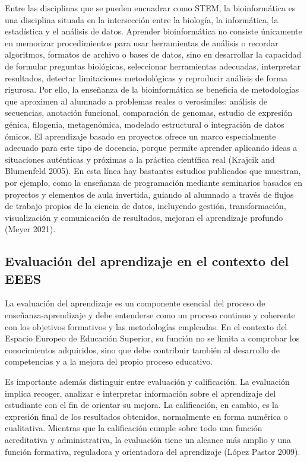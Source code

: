 \documentclass[
  11pt,
  a4paper,
  twoside]{scrreprt}
\begin{document}
Entre las disciplinas que se pueden encuadrar como STEM, la
bioinformática es una disciplina situada en la intersección entre la
biología, la informática, la estadística y el análisis de datos.
Aprender bioinformática no consiste únicamente en memorizar
procedimientos para usar herramientas de análisis o recordar algoritmos,
formatos de archivo o bases de datos, sino en desarrollar la capacidad
de formular preguntas biológicas, seleccionar herramientas adecuadas,
interpretar resultados, detectar limitaciones metodológicas y reproducir
análisis de forma rigurosa. Por ello, la enseñanza de la bioinformática
se beneficia de metodologías que aproximen al alumnado a problemas
reales o verosímiles: análisis de secuencias, anotación funcional,
comparación de genomas, estudio de expresión génica, filogenia,
metagenómica, modelado estructural o integración de datos ómicos. El
aprendizaje basado en proyectos ofrece un marco especialmente adecuado
para este tipo de docencia, porque permite aprender aplicando ideas a
situaciones auténticas y próximas a la práctica científica real (Krajcik
and Blumenfeld 2005). En esta línea hay bastantes estudios publicados
que muestran, por ejemplo, como la enseñanza de programación mediante
seminarios basados en proyectos y elementos de aula invertida, guiando
al alumnado a través de flujos de trabajo propios de la ciencia de
datos, incluyendo gestión, transformación, visualización y comunicación
de resultados, mejoran el aprendizaje profundo (Meyer 2021).

\subsection{Evaluación del aprendizaje en el contexto del
EEES}\label{evaluaciuxf3n-del-aprendizaje-en-el-contexto-del-eees}

La evaluación del aprendizaje es un componente esencial del proceso de
enseñanza-aprendizaje y debe entenderse como un proceso continuo y
coherente con los objetivos formativos y las metodologías empleadas. En
el contexto del Espacio Europeo de Educación Superior, su función no se
limita a comprobar los conocimientos adquiridos, sino que debe
contribuir también al desarrollo de competencias y a la mejora del
propio proceso educativo.

Es importante además distinguir entre evaluación y calificación. La
evaluación implica recoger, analizar e interpretar información sobre el
aprendizaje del estudiante con el fin de orientar su mejora. La
calificación, en cambio, es la expresión final de los resultados
obtenidos, normalmente en forma numérica o cualitativa. Mientras que la
calificación cumple sobre todo una función acreditativa y
administrativa, la evaluación tiene un alcance más amplio y una función
formativa, reguladora y orientadora del aprendizaje (López Pastor 2009).
\end{document}
